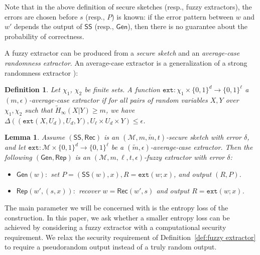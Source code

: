 \documentclass[11pt]{article}
\newcommand{\secref}[1]{\mbox{Section~\ref{#1}}}
\newcommand{\defref}[1]{\mbox{Definition~\ref{#1}}}
\newcommand{\class}[1]{{\ensuremath{\mathsf{#1}}}}
\newcommand{\gen}{\ensuremath{\class{Gen}}\xspace}
\newcommand{\rep}{\ensuremath{\class{Rep}}\xspace}
\newcommand{\sketch}{\ensuremath{\class{SS}}\xspace}
\newcommand{\rec}{\ensuremath{\class{Rec}}\xspace}
\newcommand{\zo}{\ensuremath{\{0, 1\}}}
\newcommand{\dis}{\ensuremath{\mathsf{dis}}}
\newcommand{\ext}{\ensuremath{\mathtt{ext}}}
\newtheorem{lemma}[theorem]{Lemma}
\newtheorem{definition}[theorem]{Definition}
\newcommand{\authnote}[2]{{\textcolor{red}{\textsf{#1 notes: }\textcolor{blue}{ #2}}\marginpar{\textcolor{red}{\textbf{!!!!!}}}}}
\newcommand{\authnote}[2]{}
\newcommand{\lnote}[1]{{\authnote{Leo}{#1}}}
\begin{document}
Note that in the above definition of secure sketches (resp., fuzzy extractors), the errors are chosen before $s$ (resp., $P$) is known: if the error pattern between $w$ and $w'$ depends the output of $\sketch$ (resp., $\gen$), then there is no guarantee about the probability of correctness.


A fuzzy extractor can be produced from a \emph{secure sketch} and an \emph{average-case randomness extractor}. An average-case extractor is a generalization of a strong randomness extractor \cite[Definition 2]{nisan1993randomness}):

\begin{definition}
Let $\chi_1$, $\chi_2$ be finite sets.
A function $\ext: \chi_1\times \{0,1\}^d \rightarrow \{0,1\}^\ell$ a \emph{$(m, \epsilon)$-average-case extractor} if for all pairs
of random variables $X, Y$ over $\chi_1, \chi_2$ such that
$\tilde{H}_\infty(X|Y) \ge m$, we have $\Delta((\ext(X, U_d), U_d, Y), U_\ell\times
U_d \times Y) \le \epsilon$.
\end{definition}


\begin{lemma}%
\label{lem:fuzzy ext construction}
Assume $(\sketch, \rec)$ is an $(\mathcal{M}, m, \tilde{m}, t)$-secure sketch with error $\delta$, and let $\ext:\mathcal{M}\times \zo^d \rightarrow \zo^\ell$ be a $(\tilde{m}, \epsilon)$-average-case extractor.  Then the following $(\gen, \rep)$ is an $(\mathcal{M}, m, \ell, t, \epsilon)$-fuzzy extractor with error $\delta$:
\begin{itemize}
\item $\gen(w):$ set $P=(\sketch(w), x), R=\ext(w;x)$, and output $(R,P)$.
\item $\rep(w', (s, x)):$ recover $w=\rec(w',s)$ and output $R=\ext(w;x)$.
\end{itemize}
\end{lemma}
The main parameter we will be concerned with is the entropy loss of the construction.  In this paper, we ask whether a smaller entropy loss can be achieved by considering a fuzzy extractor with a computational security requirement.  We relax the security requirement of \defref{def:fuzzy extractor} to require a pseudorandom output instead of a truly random output.
\end{document}
